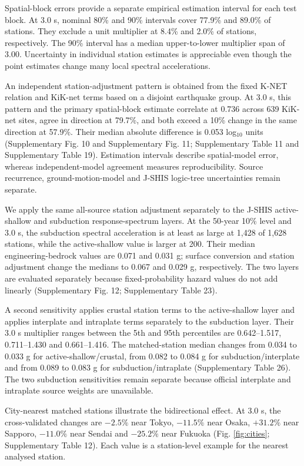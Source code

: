 \documentclass[11pt]{article}
\begin{document}
Spatial-block errors provide a separate empirical estimation interval for each test block. At 3.0 s, nominal 80\% and 90\% intervals cover 77.9\% and 89.0\% of stations. They exclude a unit multiplier at 8.4\% and 2.0\% of stations, respectively. The 90\% interval has a median upper-to-lower multiplier span of 3.00. Uncertainty in individual station estimates is appreciable even though the point estimates change many local spectral accelerations.

An independent station-adjustment pattern is obtained from the fixed K-NET relation and KiK-net terms based on a disjoint earthquake group. At 3.0 s, this pattern and the primary spatial-block estimate correlate at 0.736 across 639 KiK-net sites, agree in direction at 79.7\%, and both exceed a 10\% change in the same direction at 57.9\%. Their median absolute difference is 0.053 log$_{10}$ units (Supplementary Fig. 10 and Supplementary Fig. 11; Supplementary Table 11 and Supplementary Table 19). Estimation intervals describe spatial-model error, whereas independent-model agreement measures reproducibility. Source recurrence, ground-motion-model and J-SHIS logic-tree uncertainties remain separate.

We apply the same all-source station adjustment separately to the J-SHIS active-shallow and subduction response-spectrum layers. At the 50-year 10\% level and 3.0 s, the subduction spectral acceleration is at least as large at 1,428 of 1,628 stations, while the active-shallow value is larger at 200. Their median engineering-bedrock values are 0.071 and 0.031 g; surface conversion and station adjustment change the medians to 0.067 and 0.029 g, respectively. The two layers are evaluated separately because fixed-probability hazard values do not add linearly (Supplementary Fig. 12; Supplementary Table 23).

A second sensitivity applies crustal station terms to the active-shallow layer and applies interplate and intraplate terms separately to the subduction layer. Their 3.0 s multiplier ranges between the 5th and 95th percentiles are 0.642--1.517, 0.711--1.430 and 0.661--1.416. The matched-station median changes from 0.034 to 0.033 g for active-shallow/crustal, from 0.082 to 0.084 g for subduction/interplate and from 0.089 to 0.083 g for subduction/intraplate (Supplementary Table 26). The two subduction sensitivities remain separate because official interplate and intraplate source weights are unavailable.

City-nearest matched stations illustrate the bidirectional effect. At 3.0 s, the cross-validated changes are $-2.5\%$ near Tokyo, $-11.5\%$ near Osaka, $+31.2\%$ near Sapporo, $-11.0\%$ near Sendai and $-25.2\%$ near Fukuoka (Fig. \ref{fig:cities}; Supplementary Table 12). Each value is a station-level example for the nearest analysed station.
\end{document}
